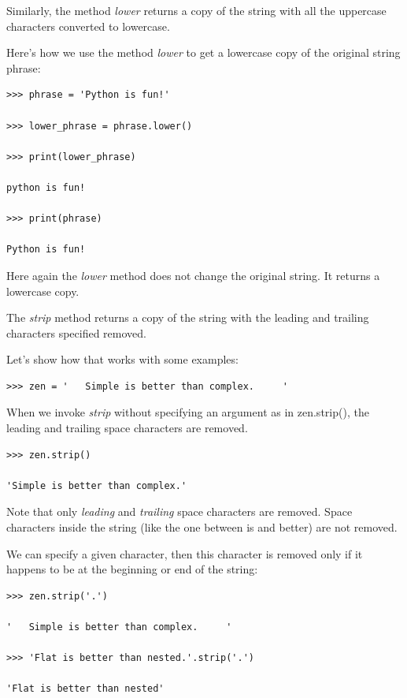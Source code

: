 \documentclass{article}
\begin{document}
Similarly, the method \textit{lower} returns a copy of the string with all the uppercase characters converted to lowercase. 

Here's how we use the method \textit{lower} to get a lowercase copy of the original string phrase:

\begin{lstlisting}
>>> phrase = 'Python is fun!' 

>>> lower_phrase = phrase.lower()

>>> print(lower_phrase)

python is fun!

>>> print(phrase)

Python is fun!
\end{lstlisting}

Here again the \textit{lower} method does not change the original string.  It returns a lowercase copy.

The \textit{strip} method returns a copy of the string with the leading and trailing characters specified removed. 

Let's show how that works with some examples:

\begin{lstlisting}
>>> zen = '   Simple is better than complex.     '
\end{lstlisting}

When we invoke \textit{strip} without specifying an argument as in zen.strip(), the leading and trailing space characters are removed.

\begin{lstlisting}
>>> zen.strip()

'Simple is better than complex.'
\end{lstlisting}

Note that only \textit{leading} and \textit{trailing} space characters are removed. Space characters inside the string (like the one between is and better) are not removed.

We can specify a given character, then this character is removed only if it happens to be at the beginning or end of the string:

\begin{lstlisting}
>>> zen.strip('.')

'   Simple is better than complex.     '

>>> 'Flat is better than nested.'.strip('.')

'Flat is better than nested'
\end{lstlisting}
\end{document}
